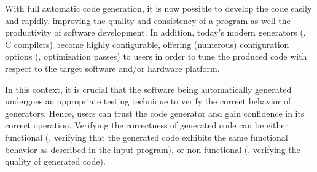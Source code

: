 
 
 
With full automatic code generation, it is now possible to develop the code easily and rapidly, improving the quality and consistency of a program as well the productivity of software development\cite{kapteijns2009comparative}. 
In addition, today's modern generators (\eg, C compilers) become highly configurable, offering
(numerous) configuration options (\eg, optimization passes) to users in order to tune the produced code with respect to the target software and/or hardware platform. 


In this context, it is crucial that the software being automatically generated undergoes an appropriate testing technique to verify the correct behavior of generators. Hence, users can trust the code generator and gain confidence in its correct operation.  
Verifying the correctness of generated code can be either functional (\eg, verifying that the generated code exhibits the same functional behavior as described in the input program), or non-functional (\eg, verifying the quality of generated code).

 
 





